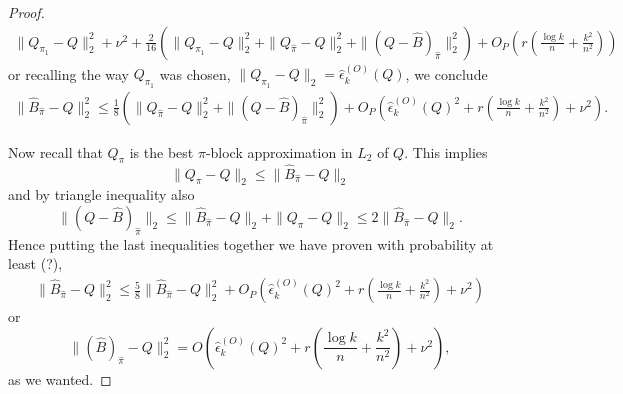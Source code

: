 \documentclass[12pt]{article}
\begin{document}
\begin{proof}
\begin{align*}
\|Q_{\pi_1}-Q\|_2^2+\nu^2+ \frac{2}{16}\left(\|Q_{\pi_1}-Q\|_2^2+\|Q_{\hat{\pi}}-Q\|_2^2+\|(Q-\hat{B})_{\hat{\pi}}\|_2^2 \right) + O_P \left( r( \frac{\log k}{n}+\frac{k^2}{n^2}  )\right)  
\end{align*}
or recalling the way $Q_{\pi_1}$ was chosen, $\|Q_{\pi_1}-Q\|_2=\hat{\epsilon}_k^{(O)}(Q)$, we conclude
\begin{align*}
\|\hat{B}_{\hat{\pi}}-Q\|_2^2 \leq \frac{1}{8}\left(\|Q_{\hat{\pi}}-Q\|_2^2+\|(Q-\hat{B})_{\hat{\pi}}\|_2^2 \right) + O_P \left( \hat{\epsilon}_k^{(O)}(Q)^2+ r( \frac{\log k}{n}+\frac{k^2}{n^2}  )+\nu^2\right) . 
\end{align*}

Now recall that $Q_{\pi}$ is the best $\pi$-block approximation in $L_2$ of $Q$. This implies $$\|Q_{\pi}-Q\|_2 \leq \|\hat{B}_{\hat{\pi}}-Q\|_2$$ and by triangle inequality  also $$\|(Q-\hat{B})_{\hat{\pi}}\|_2 \leq\|\hat{B}_{\hat{\pi}}-Q\|_2+\|Q_{\pi}-Q\|_2 \leq  2\|\hat{B}_{\hat{\pi}}-Q\|_2.$$ Hence putting the last inequalities together we have proven with probability at least (?), 
\begin{align*}
\|\hat{B}_{\hat{\pi}}-Q\|_2^2 \leq \frac{5}{8}\|\hat{B}_{\hat{\pi}}-Q\|_2^2 + O_P \left( \hat{\epsilon}_k^{(O)}(Q)^2+ r( \frac{\log k}{n}+\frac{k^2}{n^2}) + \nu^2 \right)  
\end{align*}
or 
\begin{equation*}
\|(\hat{B})_{\hat{\pi}}-Q\|_2^2 =O\left(\hat{\epsilon}_k^{(O)}(Q)^2+r\left(\frac{\log k}{n}+\frac{k^2}{n^2}\right)+\nu^2 \right),
\end{equation*}
as we wanted.
\end{proof}
\end{document}

